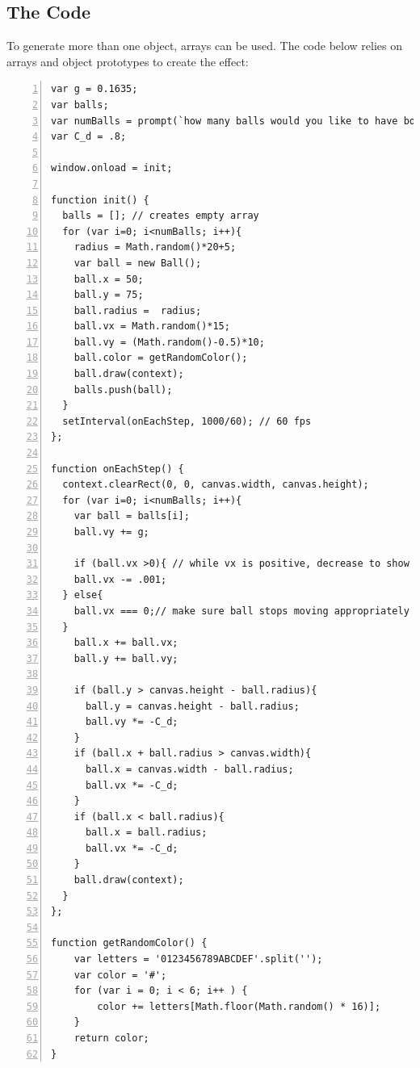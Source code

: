 \subsection{The Code}

To generate more than one object, arrays can be used.  The code below relies on arrays and object prototypes to create the effect:

\begin{lstlisting}[breaklines=true, frame=single, numbers=left, caption=Multiple bouncing balls simulation, label=lst:ballsbouncing]
var g = 0.1635;
var balls;
var numBalls = prompt(`how many balls would you like to have bounce?'); 
var C_d = .8;
 
window.onload = init; 
 
function init() {
  balls = []; // creates empty array
  for (var i=0; i<numBalls; i++){
    radius = Math.random()*20+5;
    var ball = new Ball();  
    ball.x = 50;
    ball.y = 75;
    ball.radius =  radius;
    ball.vx = Math.random()*15;
    ball.vy = (Math.random()-0.5)*10;
    ball.color = getRandomColor();
    ball.draw(context);
    balls.push(ball);
  }  
  setInterval(onEachStep, 1000/60); // 60 fps
};
 
function onEachStep() {
  context.clearRect(0, 0, canvas.width, canvas.height); 
  for (var i=0; i<numBalls; i++){
    var ball = balls[i];
    ball.vy += g;     

    if (ball.vx >0){ // while vx is positive, decrease to show friction/air drag
    ball.vx -= .001;
  } else{
    ball.vx === 0;// make sure ball stops moving appropriately
  }
    ball.x += ball.vx; 
    ball.y += ball.vy; 
      
    if (ball.y > canvas.height - ball.radius){ 
      ball.y = canvas.height - ball.radius; 
      ball.vy *= -C_d; 
    }
    if (ball.x + ball.radius > canvas.width){
      ball.x = canvas.width - ball.radius; 
      ball.vx *= -C_d;
    }
    if (ball.x < ball.radius){
      ball.x = ball.radius;
      ball.vx *= -C_d;
    }
    ball.draw(context); 
  } 
};

function getRandomColor() {
    var letters = '0123456789ABCDEF'.split('');
    var color = '#';
    for (var i = 0; i < 6; i++ ) {
        color += letters[Math.floor(Math.random() * 16)];
    }
    return color;
}
\end{lstlisting}


